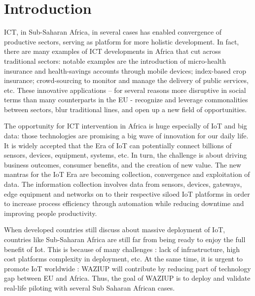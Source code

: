
\section{Introduction}

ICT, in Sub-Saharan Africa, in several cases has enabled convergence of productive sectors, serving as platform for more holistic development.
In fact, there are many examples of ICT developments in Africa that cut across traditional sectors: notable examples are the introduction of micro-health insurance and health-savings accounts through mobile devices; index-based crop insurance; crowd-sourcing to monitor and manage the delivery of public services, etc.
These innovative applications – for several reasons more disruptive in social terms than many counterparts in the EU - recognize and leverage commonalities between sectors, blur traditional lines, and open up a new field of opportunities.

The opportunity for ICT intervention in Africa is huge especially of IoT and big data: those technologies are promising a big wave of innovation for our daily life.
It is widely accepted that the Era of IoT can potentially connect billions of sensors, devices, equipment, systems, etc.
In turn, the challenge is about driving business outcomes, consumer benefits, and the creation of new value.
The new mantras for the IoT Era are becoming collection, convergence and exploitation of data.
The information collection involves data from sensors, devices, gateways, edge equipment and networks on to their respective siloed IoT platforms in order to increase process efficiency through automation while reducing downtime and improving people productivity.

When developed countries still discuss about massive deployment of IoT, countries like Sub-Saharan Africa are still far from being ready to enjoy the full benefit of Iot. This is because of many challenges : lack of infrastructure, high cost platforms complexity in deployment, etc. At the same time, it is urgent to promote IoT worldwide : WAZIUP will contribute by reducing part of technology gap between EU and Africa. Thus, the goal of WAZIUP is to deploy and validate real-life piloting with several Sub Saharan African cases. 

